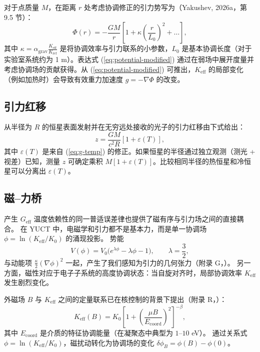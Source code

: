 \documentclass[12pt]{article}
\theoremstyle{remark}
\newcommand{\Keff}{K_{\mathrm{eff}}}
\newcommand{\eps}{\varepsilon}
\begin{document}
	对于点质量 $M$，在距离 $r$ 处考虑协调修正的引力势写为（Yakushev, 2026a，第 9.5 节）：
	\begin{equation}
		\Phi(r) = -\frac{GM}{r} \left[ 1 + \kappa \left( \frac{r}{L_0} \right)^2 + \dots \right],
		\label{eq:potential-modified}
	\end{equation}
	其中 $\kappa = \alpha_{\text{grav}} \frac{\Keff}{K_{\text{ref}}}$ 是将协调效率与引力联系的小参数，$L_0$ 是基本协调长度（对于实验室系统约为 1 m）。表达式 (\ref{eq:potential-modified}) 通过在弱场中展开度量并考虑协调场的贡献获得。从 (\ref{eq:potential-modified}) 可推出，$\Keff$ 的局部变化（例如加热时）会导致有效重力加速度 $g = -\nabla \Phi$ 的改变。
	
	\subsection{引力红移}
	\label{subsec:redshift}
	
	从半径为 $R$ 的恒星表面发射并在无穷远处接收的光子的引力红移由下式给出：
	\begin{equation}
		z = \frac{GM}{c^2 R} \left[ 1 + \eps(T) \right],
		\label{eq:redshift}
	\end{equation}
	其中 $\eps(T)$ 是来自 (\ref{eq:g-temp}) 的修正。如果恒星的半径通过独立观测（测光 + 视差）已知，测量 $z$ 可确定乘积 $M[1+\eps(T)]$。比较相同半径的热恒星和冷恒星可以分离出 $\eps(T)$。
	
	\subsection{磁–力桥}
	\label{subsec:magnetism-gravity}
	
	产生 $G_{\mathrm{eff}}$ 温度依赖性的同一普适误差律也提供了磁有序与引力场之间的直接耦合。
	在 YUCT 中，电磁学和引力都不是基本力，而是单一协调场 $\phi = \ln(\Keff/K_0)$ 的涌现投影。
	势能
	\begin{equation}
		V(\phi) = V_0\bigl(e^{\lambda\phi} - \lambda\phi - 1\bigr), \qquad \lambda = \frac{3}{2},
	\end{equation}
	与动能项 $\frac{\kappa}{2}(\nabla\phi)^2$ 一起，产生了我们感知为引力的几何张力（附录 G，\cite{AppendixG}）。
	另一方面，磁性对应于电子子系统的高度协调状态：当自旋对齐时，局部协调效率 $\Keff$ 发生剧烈变化。
	
	外磁场 $B$ 与 $\Keff$ 之间的定量联系已在核控制的背景下提出（附录 R，\cite{AppendixR}）：
	\begin{equation}
		\Keff(B) = K_0 \left[ 1 + \left( \frac{\mu B}{E_{\mathrm{coord}}} \right)^2 \right]^{-\beta},
		\label{eq:keff-B}
	\end{equation}
	其中 $E_{\mathrm{coord}}$ 是介质的特征协调能量（在凝聚态中典型为 $1$--$10$ eV）。
	通过关系式 $\phi = \ln(\Keff/K_0)$，磁扰动转化为协调场的变化 $\delta\phi_B = \phi(B) - \phi(0)$。
	
\end{document}
